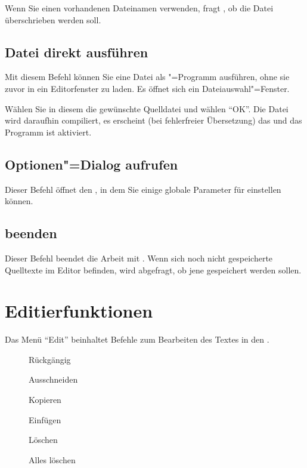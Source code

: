 Wenn Sie einen vorhandenen Dateinamen verwenden, fragt \mutabor{}, ob
die Datei überschrieben werden soll.


\subsection{Datei direkt ausführen}
\label{sec:MI_EXECUTE}

Mit diesem Befehl können Sie eine Datei als \mutabor{}"=Programm
ausführen, ohne sie zuvor in ein Editorfenster zu laden. Es öffnet
sich ein Dateiauswahl"=Fenster.


Wählen Sie in diesem die gewünschte Quelldatei und wählen "`OK"'. Die
Datei wird daraufhin compiliert, es erscheint (bei fehlerfreier
Übersetzung) das  und das
Programm ist aktiviert.

\subsection{Optionen"=Dialog aufrufen}\label{sec:MI_SETUP}

Dieser Befehl öffnet den , in 
dem Sie einige globale Parameter für \mutabor{} einstellen 
können.

\subsection{\mutabor{} beenden}
\label{sec:MI_EXIT}

Dieser Befehl beendet die Arbeit mit \mutabor{}. Wenn sich noch nicht
gespeicherte Quelltexte im Editor befinden, wird abgefragt, ob jene
gespeichert werden sollen.


\section{Editierfunktionen}\label{sec:MS_EDIT}
Das Menü "`Edit"' beinhaltet Befehle zum Bearbeiten des Textes 
in den .

\begin{description}
\item[] Rückgängig
\item[] Ausschneiden
\item[] Kopieren
\item[] Einfügen
\item[] Löschen
\item[] Alles löschen
\end{description}

